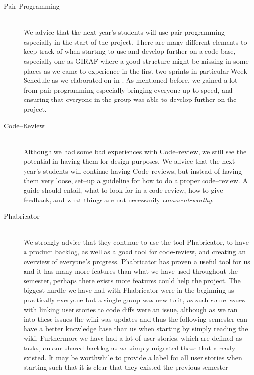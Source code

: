 \begin{description}
	\item[Pair Programming] \hfill \\
	We advice that the next year's students will use pair programming especially in the start of the project.
	There are many different elements to keep track of when starting to use and develop further on a code-base, especially one as GIRAF where a good structure might be missing in some places as we came to experience in the first two sprints in particular Week Schedule as we elaborated on in .
	As mentioned before, we gained a lot from pair programming especially bringing everyone up to speed, and ensuring that everyone in the group was able to develop further on the project.

	\item[Code--Review] \hfill \\
	Although we had some bad experiences with Code--review, we still see the potential in having them for design purposes.
	We advice that the next year's students will continue having Code--reviews, but instead of having them very loose, set--up a guideline for how to do a proper code--review.
	A guide should entail, what to look for in a code-review, how to give feedback, and what things are not necessarily \textit{comment-worthy}.

	\item[Phabricator] \hfill \\
	We strongly advice that they continue to use the tool Phabricator, to have a product backlog, as well as a good tool for code-review, and creating an overview of everyone's progress.
	Phabricator has proven a useful tool for us and it has many more features than what we have used throughout the semester, perhaps there exists more features could help the project.
	The biggest hurdle we have had with Phabricator were in the beginning as practically everyone but a single group was new to it, as such some issues with linking user stories to code diffs were an issue, although as we ran into these issues the wiki was updates and thus the following semester can have a better knowledge base than us when starting by simply reading the wiki.
	Furthermore we have had a lot of user stories, which are defined as tasks, on our shared backlog as we simply migrated those that already existed.
	It may be worthwhile to provide a label for all user stories when starting such that it is clear that they existed the previous semester.


\end{description}
